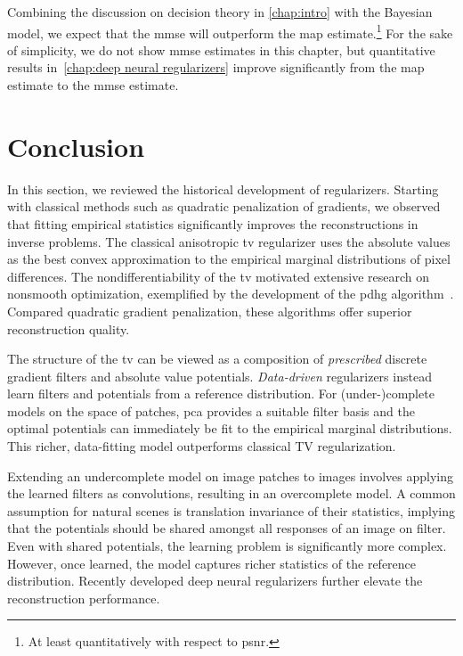 Combining the discussion on decision theory in \cref{chap:intro} with the Bayesian model, we expect that the \gls{mmse} will outperform the \gls{map} estimate.\footnote{At least quantitatively with respect to \gls{psnr}.}
For the sake of simplicity, we do not show \gls{mmse} estimates in this chapter, but quantitative results in~\cref{chap:deep neural regularizers} improve significantly from the \gls{map} estimate to the \gls{mmse} estimate.
\section{Conclusion}
In this section, we reviewed the historical development of regularizers.
Starting with classical methods such as quadratic penalization of gradients, we observed that fitting empirical statistics significantly improves the reconstructions in inverse problems.
The classical anisotropic \gls{tv} regularizer uses the absolute values as the best convex approximation to the empirical marginal distributions of pixel differences.
The nondifferentiability of the \gls{tv} motivated extensive research on nonsmooth optimization, exemplified by the development of the \gls{pdhg} algorithm~\cite{chambolle_primal_2010}.
Compared quadratic gradient penalization, these algorithms offer superior reconstruction quality.

The structure of the \gls{tv} can be viewed as a composition of \emph{prescribed} discrete gradient filters and absolute value potentials.
\emph{Data-driven} regularizers instead learn filters and potentials from a reference distribution.
For (under-)complete models on the space of patches, \gls{pca} provides a suitable filter basis and the optimal potentials can immediately be fit to the empirical marginal distributions.
This richer, data-fitting model outperforms classical TV regularization.

Extending an undercomplete model on image patches to images involves applying the learned filters as convolutions, resulting in an overcomplete model.
A common assumption for natural scenes is translation invariance of their statistics, implying that the potentials should be shared amongst all responses of an image on filter.
Even with shared potentials, the learning problem is significantly more complex.
However, once learned, the model captures richer statistics of the reference distribution.
Recently developed deep neural regularizers further elevate the reconstruction performance.

